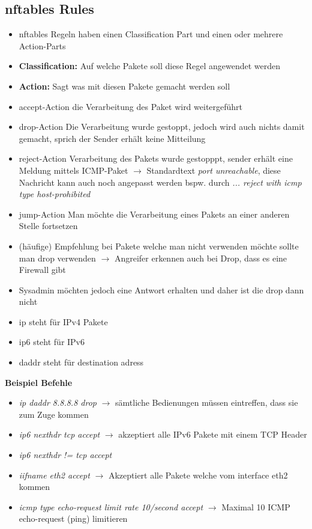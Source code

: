 \documentclass{report}
\theoremstyle{definition}
\theoremstyle{example}
\begin{document}
	\subsection{nftables Rules}
\begin{itemize}
	\item nftables Regeln haben einen Classification Part und einen oder mehrere Action-Parts
	\item \textbf{Classification:} Auf welche Pakete soll diese Regel angewendet werden
	\item \textbf{Action:} Sagt was mit diesen Pakete gemacht werden soll
	\item accept-Action die Verarbeitung des Paket wird weitergeführt
	\item drop-Action Die Verarbeitung wurde gestoppt, jedoch wird auch nichts damit gemacht, sprich der Sender erhält keine Mitteilung
	\item reject-Action Verarbeitung des Pakets wurde gestopppt, sender erhält eine Meldung mittels ICMP-Paket $\rightarrow$ Standardtext \textit{port unreachable}, diese Nachricht kann auch noch angepasst werden bspw. durch \textit{... reject with icmp type host-prohibited}
	\item jump-Action Man möchte die Verarbeitung eines Pakets an einer anderen Stelle fortsetzen
	\item (häufige) Empfehlung bei Pakete welche man nicht verwenden möchte sollte man drop verwenden $\rightarrow$ Angreifer erkennen auch bei Drop, dass es eine Firewall gibt
	\item Sysadmin möchten jedoch eine Antwort erhalten und daher ist die drop dann nicht 
	\item ip steht für IPv4 Pakete
	\item ip6 steht für IPv6
	\item daddr steht für destination adress
\end{itemize}

\textbf{Beispiel Befehle}
\begin{itemize}
	\item \textit{ip daddr 8.8.8.8 drop} $\rightarrow$ sämtliche Bedienungen müssen eintreffen, dass sie zum Zuge kommen
	\item \textit{ip6 nexthdr tcp accept} $\rightarrow$ akzeptiert alle IPv6 Pakete mit einem TCP Header
	\item \textit{ip6 nexthdr != tcp accept}
	\item \textit{iifname eth2 accept} $\rightarrow$ Akzeptiert alle Pakete welche vom interface eth2 kommen
	\item \textit{icmp type echo-request limit rate 10/second accept} $\rightarrow$ Maximal 10 ICMP echo-request (ping) limitieren
\end{itemize}
\end{document}
